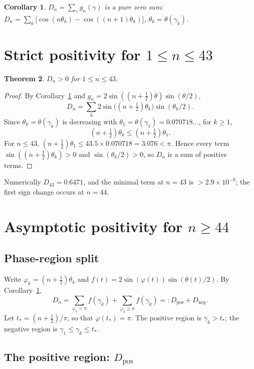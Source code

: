 \documentclass[11pt]{article}
\newtheorem{theorem}{Theorem}[section]
\newtheorem{corollary}[theorem]{Corollary}
\begin{document}
\begin{corollary}
\label{cor:D-pure}
$D_n=\sum_\gamma g_n(\gamma)$ is a pure zero sum:
$D_n=\sum_k\big[\cos(n\theta_k)-\cos((n+1)\theta_k)\big]$, $\theta_k=\theta(\gamma_k)$.
\end{corollary}

\section{Strict positivity for $1\le n\le43$}
\label{sec:small-n}

\begin{theorem}
\label{thm:small-n}
$D_n>0$ for $1\le n\le43$.
\end{theorem}

\begin{proof}
By Corollary~\ref{cor:D-pure} and $g_n=2\sin((n+\tfrac12)\theta)\sin(\theta/2)$,
\[
D_n=\sum_k 2\sin\!\big((n+\tfrac12)\theta_k\big)\sin(\theta_k/2).
\]
Since $\theta_k=\theta(\gamma_k)$ is decreasing with $\theta_1=\theta(\gamma_1)=0.070718\ldots$,
for $k\ge1$,
\[
(n+\tfrac12)\theta_k\le(n+\tfrac12)\theta_1.
\]
For $n\le43$, $(n+\tfrac12)\theta_1\le43.5\times0.070718=3.076<\pi$. Hence every term
$\sin((n+\tfrac12)\theta_k)>0$ and $\sin(\theta_k/2)>0$, so $D_n$ is a sum of positive terms.
\end{proof}

Numerically $D_{43}=0.6471$, and the minimal term at $n=43$ is $>2.9\times10^{-9}$;
the first sign change occurs at $n=44$.

\section{Asymptotic positivity for $n\ge44$}
\label{sec:large-n}

\subsection{Phase-region split}

Write $\varphi_k=(n+\tfrac12)\theta_k$ and $f(t)=2\sin(\varphi(t))\sin(\theta(t)/2)$.
By Corollary~\ref{cor:D-pure},
\[
D_n=\sum_{\varphi_k<\pi} f(\gamma_k)+\sum_{\varphi_k\ge\pi} f(\gamma_k)=:D_{\mathrm{pos}}+D_{\mathrm{neg}}.
\]
Let $t_*=(n+\tfrac12)/\pi$, so that $\varphi(t_*)=\pi$. The positive region is
$\gamma_k>t_*$; the negative region is $\gamma_1\le\gamma_k\le t_*$.

\subsection{The positive region: $D_{\mathrm{pos}}$}
\label{sec:pos}
\end{document}

